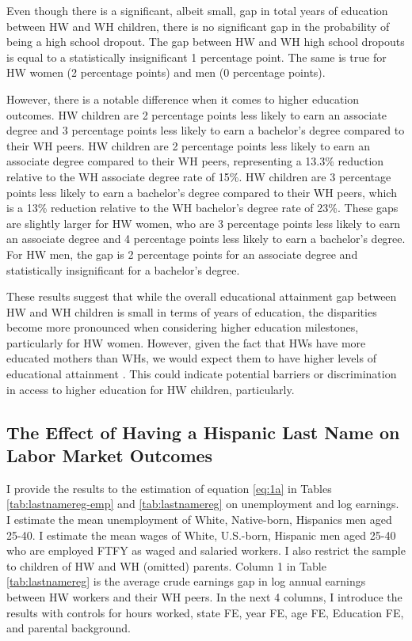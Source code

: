 Even though there is a significant, albeit small, gap in total years of education between HW and WH children, there is no significant gap in the probability of being a high school dropout. The gap between HW and WH high school dropouts is equal to a statistically insignificant 1 percentage point. The same is true for HW women (2 percentage points) and men (0 percentage points).

However, there is a notable difference when it comes to higher education outcomes. HW children are 2 percentage points less likely to earn an associate degree and 3 percentage points less likely to earn a bachelor's degree compared to their WH peers. HW children are 2 percentage points less likely to earn an associate degree compared to their WH peers, representing a 13.3\% reduction relative to the WH associate degree rate of 15\%. HW children are 3 percentage points less likely to earn a bachelor's degree compared to their WH peers, which is a 13\% reduction relative to the WH bachelor's degree rate of 23\%. These gaps are slightly larger for HW women, who are 3 percentage points less likely to earn an associate degree and 4 percentage points less likely to earn a bachelor's degree. For HW men, the gap is 2 percentage points for an associate degree and statistically insignificant for a bachelor's degree.


These results suggest that while the overall educational attainment gap between HW and WH children is small in terms of years of education, the disparities become more pronounced when considering higher education milestones, particularly for HW women. However, given the fact that HWs have more educated mothers than WHs, we would expect them to have higher levels of educational attainment \autocite{kimball2009risk, gould2020does}. This could indicate potential barriers or discrimination in access to higher education for HW children, particularly.

\subsection{The Effect of Having a Hispanic Last Name on Labor Market Outcomes}

I provide the results to the estimation of equation \ref{eq:1a} in Tables \ref{tab:lastnamereg-emp} and \ref{tab:lastnamereg} on unemployment and log earnings. I estimate the mean unemployment of White, Native-born, Hispanics men aged 25-40. I estimate the mean wages of White, U.S.-born, Hispanic men aged 25-40 who are employed FTFY as waged and salaried workers. I also restrict the sample to children of HW and WH (omitted) parents. Column 1 in Table \ref{tab:lastnamereg} is the average crude earnings gap in log annual earnings between HW workers and their WH peers. In the next 4 columns, I introduce the results with controls for hours worked, state FE, year FE, age FE, Education FE, and parental background. 

